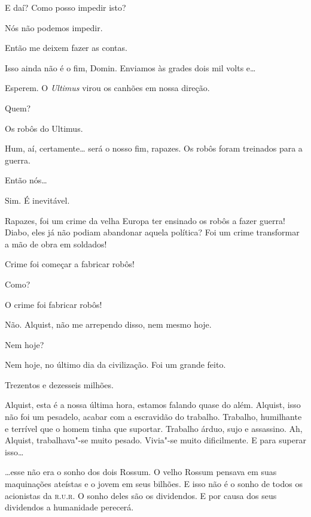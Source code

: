  E daí? Como posso impedir isto?

 Nós não podemos impedir.

 Então me deixem fazer as contas. 

 Isso ainda não é o fim, Domin. Enviamos às grades dois mil volts e\ldots{}

 Esperem. O \textit{Ultimus} virou os canhões em nossa direção.

 Quem?

 Os robôs do Ultimus.

 Hum, aí, certamente\ldots{} será o nosso fim, rapazes. Os robôs foram
treinados para a guerra.

 Então nós\ldots{}

 Sim. É inevitável.


 Rapazes, foi um crime da velha Europa ter ensinado os robôs a fazer
guerra! Diabo, eles já não podiam abandonar aquela política? Foi um crime
transformar a mão de obra em soldados!

 Crime foi começar a fabricar robôs!

 Como?

 O crime foi fabricar robôs!

 Não. Alquist, não me arrependo disso, nem mesmo hoje.

 Nem hoje?

 Nem hoje, no último dia da civilização. Foi um grande feito.

  Trezentos e dezesseis milhões.

  Alquist, esta é a nossa última hora, estamos falando
quase do além. Alquist, isso não foi um pesadelo, acabar com a escravidão do
trabalho. Trabalho, humilhante e terrível que o homem tinha que suportar.
Trabalho árduo, sujo e assassino. Ah, Alquist, trabalhava"-se muito pesado.
Vivia"-se muito dificilmente. E para superar isso\ldots{}

 \ldots{}esse não era o sonho dos dois Rossum. O velho Rossum pensava em 
suas maquinações ateístas e o jovem em seus bilhões. E isso não é o sonho de
todos os acionistas da \textsc{r.u.r.} O sonho deles são os dividendos. E por causa
dos seus dividendos a humanidade perecerá.

